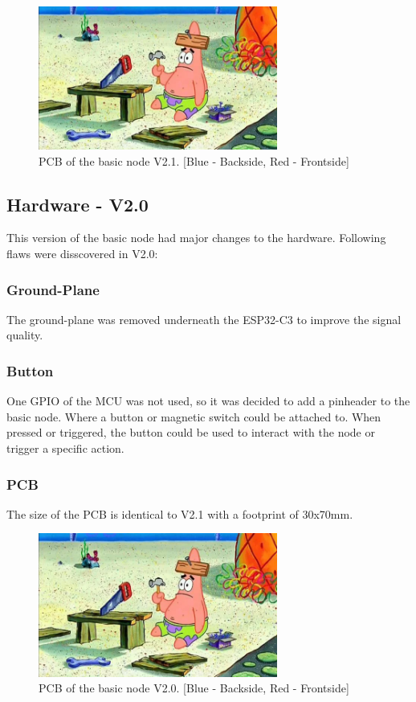     \begin{figure}[H]
        \centering
        \includegraphics[width=0.7\textwidth]{assets/HW/TBD.png}
        \caption{PCB of the basic node V2.1. [Blue - Backside, Red - Frontside]}
    \end{figure}


\subsection{Hardware - V2.0}

    This version of the basic node had major changes to the hardware. Following flaws
    were disscovered in V2.0:

    \subsubsection{Ground-Plane}
        The ground-plane was removed underneath the ESP32-C3 to improve the
        signal quality. 

    \subsubsection{Button}
        One GPIO of the MCU was not used, so it was decided to add a pinheader to the basic node.
        Where a button or magnetic switch could be attached to. When pressed or triggered, the
        button could be used to interact with the node or trigger a specific action.

    \subsubsection{PCB}
        The size of the PCB is identical to V2.1 with a footprint of 30x70mm.
        
    \begin{figure}[H]
        \centering
        \includegraphics[width=0.7\textwidth]{assets/HW/TBD.png}
        \caption{PCB of the basic node V2.0. [Blue - Backside, Red - Frontside]}
    \end{figure}
